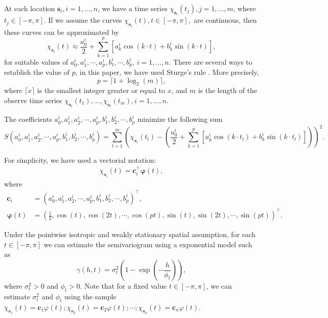 \documentclass[]{interact}
\theoremstyle{plain}%
\theoremstyle{definition}
\theoremstyle{remark}
\begin{document}
At each location \(\bm{s}_i, i=1, \dots, n\), we have a time series \(\chi_{\bm{s}_i}(t_j), j=1, \dots, m\), where \(t_j \in [-\pi, \pi]\).
If we assume the curves \(\chi_{\bm{s}_i}(t), t\in [-\pi, \pi],\) are continuous, then these curves can be approximated by
\begin{equation*}
\chi_{\bm{s}_i}(t) \approx \dfrac{a_0^i}{2} + \sum_{k=1}^{p} \left[ a_k^i \cos(k\cdot t) + b_k^i \sin(k \cdot t) \right],
\end{equation*}
for suitable values of \(a_0^i, a_1^i, \cdots, a_p^i, b_1^i, \cdots, b_p^i, \ i=1, \dots, n\).
There are several ways to establish the value of \(p\), in this paper, we have used Sturge's rule \citep[see][ for more details]{scott2009sturges}. More precisely,
\begin{equation*}
p= \lceil 1+\log_2(m) \rceil,
\end{equation*}
where \(\lceil x \rceil\) is the smallest integer greater or equal to \(x\), and \(m\) is the length of the observe time series \(\chi_{\bm{s}_i}(t_1), \dots, \chi_{\bm{s}_i}(t_m), i=1, \dots, n\).

The coefficients \(a_0^i, a_1^i, a_2^i, \cdots, a_p^i, b_1^i, b_2^i, \cdots, b_p^i\) minimize the following sum
\begin{equation*}
S(a_0^i, a_1^i, a_2^i, \cdots, a_p^i, b_1^i, b_2^i, \cdots, b_p^i) =  \sum_{l=1}^{m}  \left( \chi_{\bm{s}_i}(t_l) - \left(
\dfrac{a_0^i}{2} + \sum_{k=1}^{p} \left[ a_k^i \cos(k\cdot t_l) + b_k^i \sin(k \cdot t_l) \right] \right) \right)^2 .
\end{equation*}

For simplicity, we have used a vectorial notation:
\begin{align*}
\chi_{\bm{s}_i}(t) =  \bm{c}_i^\top \bm{\varphi}(t),
\end{align*}
where
\begin{align*}
\bm{c}_i &= \left(a_0^i, a_1^i, a_2^i, \cdots, a_p^i, b_1^i, b_2^i, \cdots, b_p^i\right) ^\top,\\
\bm{\varphi}(t) &= \left( \frac{1}{2}, \cos(t), \cos(2t) , \cdots, \cos(pt), \sin(t), \sin(2t) , \cdots, \sin(pt)\right)^\top.
\end{align*}

Under the pointwise isotropic and weakly stationary spatial assumption, for each \(t \in [-\pi, \pi]\) we can estimate the semivariogram using a exponential model such as
\begin{equation*}
\gamma(h, t) = \sigma_t^2 \left(1-\exp\left( -\dfrac{h}{\phi_t} \right)\right),
\end{equation*}
where \(\sigma_t^2 >0\) and \(\phi_t > 0\). Note that for a fixed value \(t \in [-\pi, \pi]\), we can estimate \(\sigma_t^2\) and \(\phi_t\) using the sample \(\chi_{\bm{s}_1}(t)=\bm{c}_1\varphi(t); \chi_{\bm{s}_2}(t)= \bm{c}_2\varphi(t);\cdots; \chi_{\bm{s}_n}(t)=\bm{c}_n\varphi(t)\).
\end{document}
